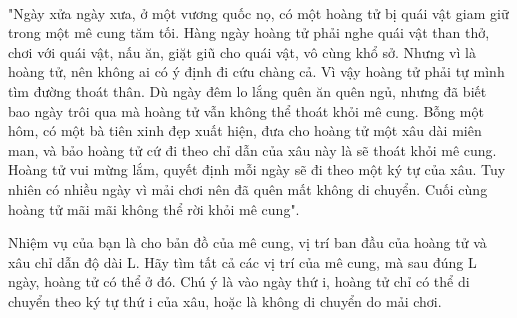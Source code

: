  

"Ngày xửa ngày xưa, ở một vương quốc nọ, có một hoàng tử bị quái vật giam giữ trong một mê cung tăm tối. Hàng ngày hoàng tử phải nghe quái vật than thở, chơi với quái vật, nấu ăn, giặt giũ cho quái vật, vô cùng khổ sở. Nhưng vì là hoàng tử, nên không ai có ý định đi cứu chàng cả. Vì vậy hoàng tử phải tự mình tìm đường thoát thân. Dù ngày đêm lo lắng quên ăn quên ngủ, nhưng đã biết bao ngày trôi qua mà hoàng tử vẫn không thể thoát khỏi mê cung. Bỗng một hôm, có một bà tiên xinh đẹp xuất hiện, đưa cho hoàng tử một xâu dài miên man, và bảo hoàng tử cứ đi theo chỉ dẫn của xâu này là sẽ thoát khỏi mê cung. Hoàng tử vui mừng lắm, quyết định mỗi ngày sẽ đi theo một ký tự của xâu. Tuy nhiên có nhiều ngày vì mải chơi nên đã quên mất không di chuyển. Cuối cùng hoàng tử mãi mãi không thể rời khỏi mê cung".

Nhiệm vụ của bạn là cho bản đồ của mê cung, vị trí ban đầu của hoàng tử và xâu chỉ dẫn độ dài L. Hãy tìm tất cả các vị trí của mê cung, mà sau đúng L ngày, hoàng tử có thể ở đó. Chú ý là vào ngày thứ i, hoàng tử chỉ có thể di chuyển theo ký tự thứ i của xâu, hoặc là không di chuyển do mải chơi.